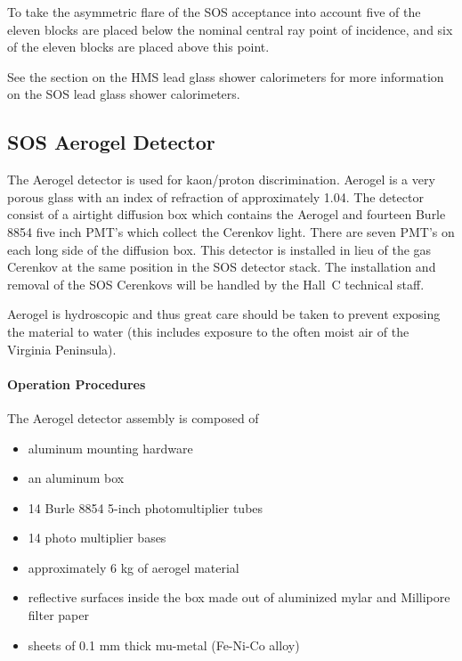 To take the asymmetric flare of the SOS acceptance into account five of the
eleven blocks are placed below the nominal central ray point of incidence,
and six of the eleven blocks are placed above this point.

See the section on the HMS lead glass shower calorimeters for
 more information on the SOS lead glass
shower calorimeters.


\subsection{SOS Aerogel Detector }

The Aerogel detector is used for kaon/proton discrimination.
Aerogel is a very porous glass with an index of refraction of approximately
1.04.
The detector consist of a airtight diffusion box which contains the
Aerogel and fourteen Burle 8854 five inch PMT's which collect
the Cerenkov light. There are seven PMT's on each long side of the diffusion
box.
This detector is installed in lieu of the gas Cerenkov
at the same position in the SOS detector stack. The installation and
removal of the SOS Cerenkovs will be handled by the Hall~C technical staff.

Aerogel is hydroscopic and thus great care should be taken to prevent
exposing the material to water (this includes exposure to the often moist
air of the Virginia Peninsula).


\paragraph{Operation Procedures}

The Aerogel detector assembly is composed of

\begin{itemize}
\item{aluminum mounting hardware}
\item{an aluminum box}
\item{14 Burle 8854 5-inch photomultiplier tubes}
\item{14 photo multiplier bases}
\item{approximately 6 kg of aerogel material}
\item{reflective surfaces inside the box made out of
aluminized mylar and Millipore filter paper}
\item{sheets of 0.1 mm thick mu-metal (Fe-Ni-Co alloy)}
\end{itemize}


